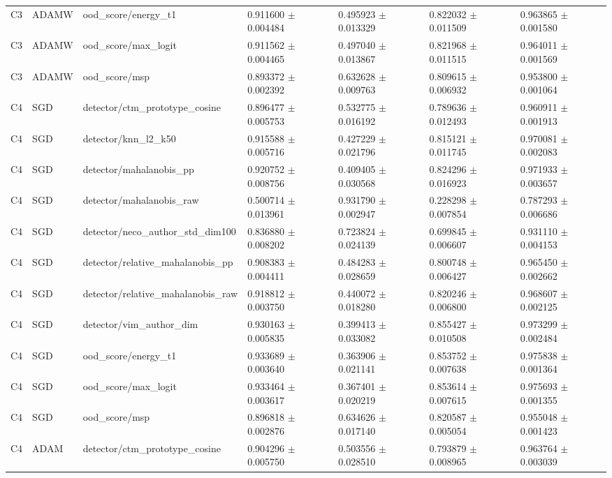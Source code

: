\begin{longtable}{lllllll}
C3 & ADAMW & ood\_score/energy\_t1 & 0.911600 $\pm$ 0.004484 & 0.495923 $\pm$ 0.013329 & 0.822032 $\pm$ 0.011509 & 0.963865 $\pm$ 0.001580 \\
C3 & ADAMW & ood\_score/max\_logit & 0.911562 $\pm$ 0.004465 & 0.497040 $\pm$ 0.013867 & 0.821968 $\pm$ 0.011515 & 0.964011 $\pm$ 0.001569 \\
C3 & ADAMW & ood\_score/msp & 0.893372 $\pm$ 0.002392 & 0.632628 $\pm$ 0.009763 & 0.809615 $\pm$ 0.006932 & 0.953800 $\pm$ 0.001064 \\
C4 & SGD & detector/ctm\_prototype\_cosine & 0.896477 $\pm$ 0.005753 & 0.532775 $\pm$ 0.016192 & 0.789636 $\pm$ 0.012493 & 0.960911 $\pm$ 0.001913 \\
C4 & SGD & detector/knn\_l2\_k50 & 0.915588 $\pm$ 0.005716 & 0.427229 $\pm$ 0.021796 & 0.815121 $\pm$ 0.011745 & 0.970081 $\pm$ 0.002083 \\
C4 & SGD & detector/mahalanobis\_pp & 0.920752 $\pm$ 0.008756 & 0.409405 $\pm$ 0.030568 & 0.824296 $\pm$ 0.016923 & 0.971933 $\pm$ 0.003657 \\
C4 & SGD & detector/mahalanobis\_raw & 0.500714 $\pm$ 0.013961 & 0.931790 $\pm$ 0.002947 & 0.228298 $\pm$ 0.007854 & 0.787293 $\pm$ 0.006686 \\
C4 & SGD & detector/neco\_author\_std\_dim100 & 0.836880 $\pm$ 0.008202 & 0.723824 $\pm$ 0.024139 & 0.699845 $\pm$ 0.006607 & 0.931110 $\pm$ 0.004153 \\
C4 & SGD & detector/relative\_mahalanobis\_pp & 0.908383 $\pm$ 0.004411 & 0.484283 $\pm$ 0.028659 & 0.800748 $\pm$ 0.006427 & 0.965450 $\pm$ 0.002662 \\
C4 & SGD & detector/relative\_mahalanobis\_raw & 0.918812 $\pm$ 0.003750 & 0.440072 $\pm$ 0.018280 & 0.820246 $\pm$ 0.006800 & 0.968607 $\pm$ 0.002125 \\
C4 & SGD & detector/vim\_author\_dim & 0.930163 $\pm$ 0.005835 & 0.399413 $\pm$ 0.033082 & 0.855427 $\pm$ 0.010508 & 0.973299 $\pm$ 0.002484 \\
C4 & SGD & ood\_score/energy\_t1 & 0.933689 $\pm$ 0.003640 & 0.363906 $\pm$ 0.021141 & 0.853752 $\pm$ 0.007638 & 0.975838 $\pm$ 0.001364 \\
C4 & SGD & ood\_score/max\_logit & 0.933464 $\pm$ 0.003617 & 0.367401 $\pm$ 0.020219 & 0.853614 $\pm$ 0.007615 & 0.975693 $\pm$ 0.001355 \\
C4 & SGD & ood\_score/msp & 0.896818 $\pm$ 0.002876 & 0.634626 $\pm$ 0.017140 & 0.820587 $\pm$ 0.005054 & 0.955048 $\pm$ 0.001423 \\
C4 & ADAM & detector/ctm\_prototype\_cosine & 0.904296 $\pm$ 0.005750 & 0.503556 $\pm$ 0.028510 & 0.793879 $\pm$ 0.008965 & 0.963764 $\pm$ 0.003039 \\

\end{longtable}
